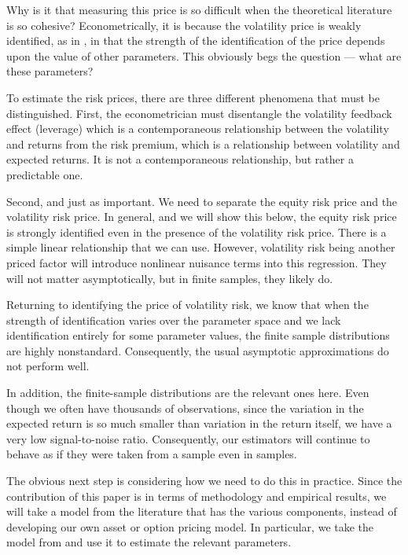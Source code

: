 \documentclass[11pt, letterpaper, twoside, final]{article}
\begin{document}
Why is it that measuring this price is so difficult when the theoretical literature is so cohesive?
Econometrically, it is because the volatility price is weakly identified, as in \textcite{andrews2012estimation},
in that the strength of the identification of the price depends upon the value of other parameters. 
This obviously begs the question --- what are these parameters? 

To estimate the risk prices, there are three different phenomena that must be distinguished.
First, the econometrician must disentangle the volatility feedback effect (leverage) which is a contemporaneous
relationship between the volatility and returns from the risk premium, which is a relationship between volatility
and expected returns. 
It is not a contemporaneous relationship, but rather a predictable one. 

Second, and just as important.
We need to separate the equity risk price and the volatility risk price. 
In general, and we will show this below, the equity risk price is strongly identified even in the presence of the
volatility risk price. 
There is a simple linear relationship that we can use.
However, volatility risk being another priced factor will introduce nonlinear nuisance terms into this regression. 
They will not matter asymptotically, but in finite samples, they likely do.

Returning to identifying the price of volatility risk, we know that when the strength of identification varies over
the parameter space and we lack identification entirely for some parameter values, the finite sample distributions
are highly nonstandard. 
Consequently, the usual asymptotic approximations do not perform well. 

In addition, the finite-sample distributions are the relevant ones here. 
Even though we often have thousands of observations, since the variation in the expected return is so much smaller
than variation in the return itself, we have a very low signal-to-noise ratio.
Consequently, our estimators will continue to behave as if they were taken from a  sample even in
 samples.

The obvious next step is considering how we need to do this in practice.
Since the contribution of this paper is in terms of methodology and empirical results, we will take a model from
the literature that has the various components, instead of developing our own asset or option pricing model.
In particular, we take the model from \textcite{khrapov2016affine} and use it to estimate the relevant parameters. 
\end{document}

